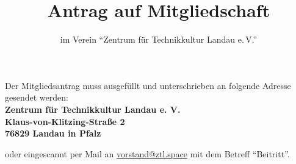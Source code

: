 \documentclass[a4paper, 11pt]{scrartcl}
\begin{document}
\def\LayoutTextField#1#2{%
  #2%
}

\vspace{-6cm}
\title{\vspace{-2.0cm}Antrag auf Mitgliedschaft}
\subtitle{im Verein "`Zentrum für Technikkultur Landau e.\,V."'}
\author{}
\date{}

\maketitle
\thispagestyle{empty}
\vspace{-2cm}

Der Mitgliedsantrag muss ausgefüllt und unterschrieben an folgende Adresse gesendet werden:\\

\textbf{Zentrum für Technikkultur Landau e. V.\\
Klaus-von-Klitzing-Straße 2\\
76829 Landau in Pfalz\\
}

oder eingescannt per Mail an \href{mailto:vorstand@ztl.space}{vorstand@ztl.space} mit dem Betreff "`Beitritt"'.\\
\end{document}
